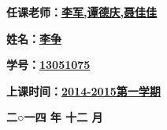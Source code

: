 \documentclass[paper=a4, fontsize=10.5pt]{scrartcl} %
\numberwithin{equation}{section} %
\numberwithin{figure}{section} %
\numberwithin{table}{section} %
\begin{document}
\begin{CJK}{UTF8}{gbsn}
{\begin{flushleft}
	\textbf{\hspace{2cm}任课老师：\underline{李军,谭德庆,聂佳佳\hspace{0.5cm}}}
	\vspace{0.5cm}
	
	\textbf{\hspace{2cm}姓\hspace{1.6cm}名：\underline{\hspace{1cm}李争\hspace{4.6cm}}}\\
	\vspace{0.5cm}
	
	\textbf{\hspace{2cm}学\hspace{1.6cm}号：\underline{\hspace{1cm}13051075\hspace{2.8cm}}}
	\vspace{0.5cm}
	
	\textbf{\hspace{2cm}上课时间：\underline{2014-2015第一学期\hspace{0.5cm}}}
				
\end{flushleft}
\vspace{1cm}
\begin{center}
	\textbf{二○一四 年 十二 月}
\end{center}
}
\endgroup

\newtheorem{theorem}{{定理}} 
\newtheorem{proposition}{{命题}} 
\newtheorem{lemma}{{引理}} 
\newtheorem{corollary}{{推论}}[theorem] 
\newtheorem{definition}{{定义}} 
\newtheorem{example}{{例}} 
\renewcommand{\refname}{参考文献}   %

\renewcommand{\appendixpagename}{附录}








\end{CJK}
\end{document}
